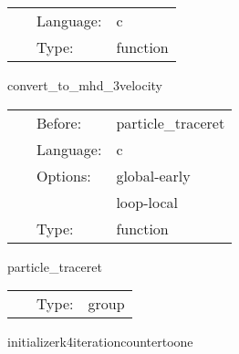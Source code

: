  \begin{tabular*}{160mm}{cll} 
~ & Language:  & c \\ 
~ & Type:  & function \\ 
\end{tabular*} 


\vspace{5mm}


\hspace{5mm} convert\_to\_mhd\_3velocity 

\hspace{5mm}{\it convert to mhd 3 velocity } 


\hspace{5mm}

 \begin{tabular*}{160mm}{cll} 
~ & Before:  & particle\_traceret \\ 
~ & Language:  & c \\ 
~ & Options:  & global-early \\ 
~& ~ &loop-local\\ 
~ & Type:  & function \\ 
\end{tabular*} 


\vspace{5mm}


\hspace{5mm} particle\_traceret 

\hspace{5mm}{\it particle traceret subroutines } 


\hspace{5mm}

 \begin{tabular*}{160mm}{cll} 
~ & Type:  & group \\ 
\end{tabular*} 


\vspace{5mm}


\hspace{5mm} initializerk4iterationcountertoone 

\hspace{5mm}{\it initialize rk4iterationcounter variable to one } 


\hspace{5mm}

